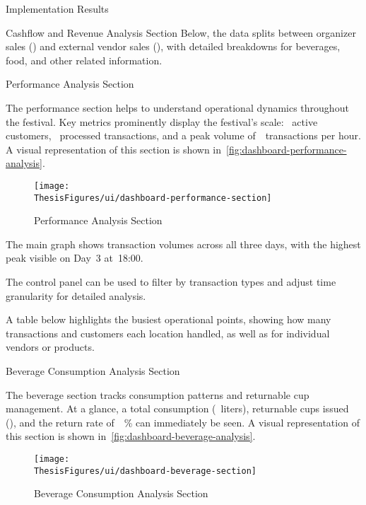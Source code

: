 \begin{section}{Implementation Results}
\begin{subsection}{Cashflow and Revenue Analysis Section}
		Below, the data splits between organizer sales () and external vendor sales (), with detailed breakdowns for beverages, food, and other related information.
	\end{subsection}

	\begin{subsection}{Performance Analysis Section}
		\label{subsec:implementation-results-structure-performance}

		The performance section helps to understand operational dynamics throughout the festival.
		Key metrics prominently display the festival's scale: ~active customers, ~processed transactions, and a peak volume of~~transactions per hour.
		A visual representation of this section is shown in~\autoref{fig:dashboard-performance-analysis}.

		\begin{figure}[h]
			\centering
			\texttt{[image: \\ThesisFigures/ui/dashboard-performance-section]}
			\caption{Performance Analysis Section}
			\source
			\label{fig:dashboard-performance-analysis}
		\end{figure}

		The main graph shows transaction volumes across all three days, with the highest peak visible on Day~3 at~18:00.

		The control panel can be used to filter by transaction types and adjust time granularity for detailed analysis.

		A table below highlights the busiest operational points, showing how many transactions and customers each location handled, as well as for individual vendors or products.
	\end{subsection}

	\begin{subsection}{Beverage Consumption Analysis Section}
		\label{subsec:implementation-results-structure-beverage}

		The beverage section tracks consumption patterns and returnable cup management.
		At a glance, a total consumption (~liters), returnable cups issued (), and the return rate of~~\% can immediately be seen.
		A visual representation of this section is shown in~\autoref{fig:dashboard-beverage-analysis}.

		\begin{figure}[h]
			\centering
			\texttt{[image: \\ThesisFigures/ui/dashboard-beverage-section]}
			\caption{Beverage Consumption Analysis Section}
			\source
			\label{fig:dashboard-beverage-analysis}
		\end{figure}


\end{subsection}
\end{section}
